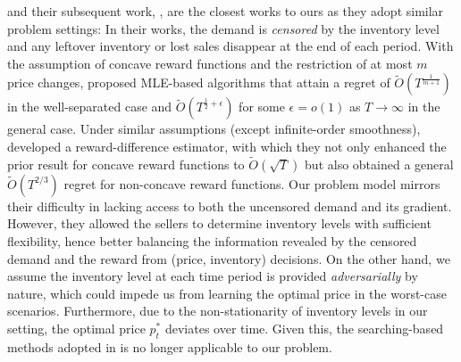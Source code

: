 \citet{chenbx2021nonparametric} and their subsequent work, \citet{chen2023optimal}, are the closest works to ours as they adopt similar problem settings: In their works, the demand is \emph{censored} by the inventory level and any leftover inventory or lost sales disappear at the end of each period. With the assumption of concave reward functions and the restriction of at most $m$ price changes, \citet{chenbx2021nonparametric} proposed MLE-based algorithms that attain a regret of $\tilde{O}(T^{\frac1{m+1}})$ in the well-separated case and $\tilde{O}(T^{\frac12+\epsilon})$ for some  $\epsilon=o(1)$ as $T\rightarrow\infty$ in the general case. Under similar assumptions (except infinite-order smoothness), \citet{chen2023optimal} developed a reward-difference estimator, with which they not only enhanced the prior result for concave reward functions to $\tilde{O}(\sqrt{T})$ but also obtained a general $\tilde{O}(T^{2/3})$ regret for non-concave reward functions. Our problem model mirrors their difficulty in lacking access to both the uncensored demand and its gradient. However, they allowed the sellers to determine inventory levels with sufficient flexibility, hence better balancing the information revealed by the censored demand and the reward from (price, inventory) decisions. On the other hand, we assume the inventory level at each time period is provided \emph{adversarially} by nature, which could impede us from learning the optimal price in the worst-case scenarios. Furthermore, due to the non-stationarity of inventory levels in our setting, the optimal price $p_t^*$ deviates over time. Given this, the searching-based methods adopted in \citet{chen2023optimal} is no longer applicable to our problem.